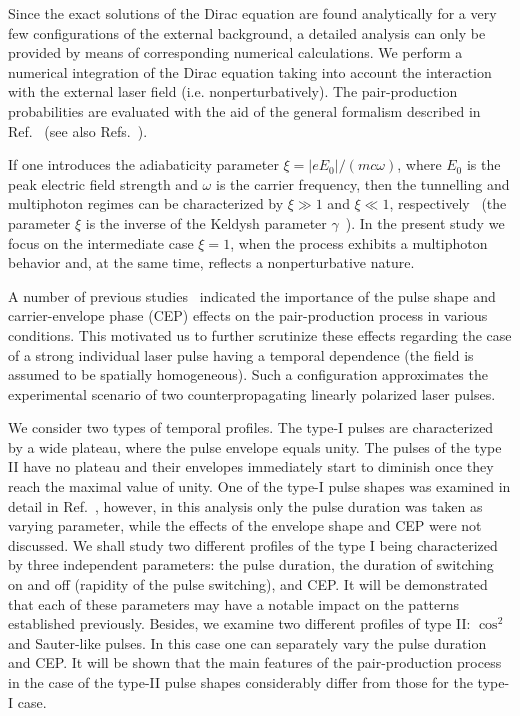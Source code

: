 \documentclass[preprint,aps,prd,showpacs,floatfix]{revtex4-1}
\begin{document}
\indent Since the exact solutions of the Dirac equation are found analytically for a very few configurations of the external background, a detailed analysis can only be provided by means of  corresponding numerical calculations. We perform a numerical integration of the Dirac equation taking into account the interaction with the external laser field (i.e. nonperturbatively). The pair-production probabilities are evaluated with the aid of the general formalism described in Ref.~\cite{fradkin_gitman_shvartsman} (see also Refs.~\cite{gav_git_prd_1996, adorno_phys_scr_2015, adorno_2015, adorno_2016}).

\indent If one introduces the adiabaticity parameter $\xi = |eE_0|/(mc\omega)$, where $E_0$ is the peak electric field strength and $\omega$ is the carrier frequency, then the tunnelling and multiphoton regimes can be characterized by $\xi \gg 1$ and $\xi \ll 1$, respectively~\cite{keldysh} (the parameter $\xi$ is the inverse of the Keldysh parameter $\gamma$~\cite{keldysh}). In the present study we focus on the intermediate case $\xi = 1$, when the process exhibits a multiphoton behavior and, at the same time, reflects a nonperturbative nature.

\indent A number of previous studies~\cite{heinzl_plb_2010, linder_prd_2015, hebenstreit_prl_2009, abdukerim_plb_2013, dumlu_dunne_prd_2011, hebenstreit_prd_2010, jansen_prd_2016, hebenstreit_plb_2014, nuriman_plb_2012, kohlfuerst_prd_2013, titov_prd_2016} indicated the importance of the pulse shape and carrier-envelope phase (CEP) effects on the pair-production process in various conditions. This motivated us to further scrutinize these effects regarding the case of a strong individual laser pulse having a temporal dependence (the field is assumed to be spatially homogeneous). Such a configuration approximates the experimental scenario of two counterpropagating linearly polarized laser pulses.

\indent We consider two types of temporal profiles. The type-I pulses are characterized by a wide plateau, where the pulse envelope equals unity. The pulses of the type II have no plateau and their envelopes immediately start to diminish once they reach the maximal value of unity. One of the type-I pulse shapes was examined in detail in Ref.~\cite{mocken_pra_2010}, however, in this analysis only the pulse duration was taken as varying parameter, while the effects of the envelope shape and CEP were not discussed. We shall study two different profiles of the type I being characterized by three independent parameters: the pulse duration, the duration of switching on and off (rapidity of the pulse switching), and CEP. It will be demonstrated that each of these parameters may have a notable impact on the patterns established previously. Besides, we examine two different profiles of type II: $\cos^2$ and Sauter-like pulses. In this case one can separately vary the pulse duration and CEP. It will be shown that the main features of the pair-production process in the case of the type-II pulse shapes considerably differ from those for the type-I case.
\end{document}
